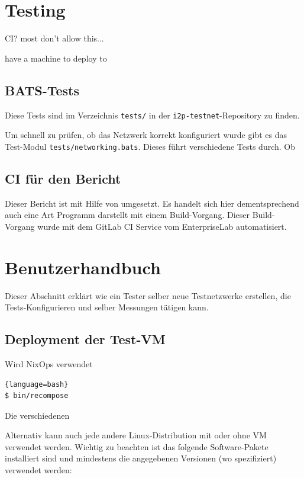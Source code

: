 \section{Testing}

CI? most don't allow this...

have a machine to deploy to

\subsection{BATS-Tests}

Diese Tests sind im Verzeichnis \lstinline|tests/| in der \lstinline|i2p-testnet|-Repository zu finden.

Um schnell zu prüfen, ob das Netzwerk korrekt konfiguriert wurde gibt es das Test-Modul \lstinline|tests/networking.bats|.
Dieses führt verschiedene Tests durch. Ob

\subsection{CI für den Bericht}

Dieser Bericht ist mit Hilfe von \LaTex umgesetzt.
Es handelt sich hier dementsprechend auch eine Art Programm darstellt mit einem Build-Vorgang.
Dieser Build-Vorgang wurde mit dem GitLab CI Service vom EnterpriseLab automatisiert.

\section{Benutzerhandbuch}

Dieser Abschnitt erklärt wie ein Tester selber neue Testnetzwerke erstellen, die Tests-Konfigurieren und selber Messungen tätigen kann.

\subsection{Deployment der Test-VM}

Wird NixOps verwendet 

\begin{lstlisting}{language=bash}
$ bin/recompose
\end{lstlisting}

Die verschiedenen


Alternativ kann auch jede andere Linux-Distribution mit oder ohne VM verwendet werden.
Wichtig zu beachten ist das folgende Software-Pakete installiert sind und mindestens die angegebenen Versionen (wo spezifiziert) verwendet werden:


